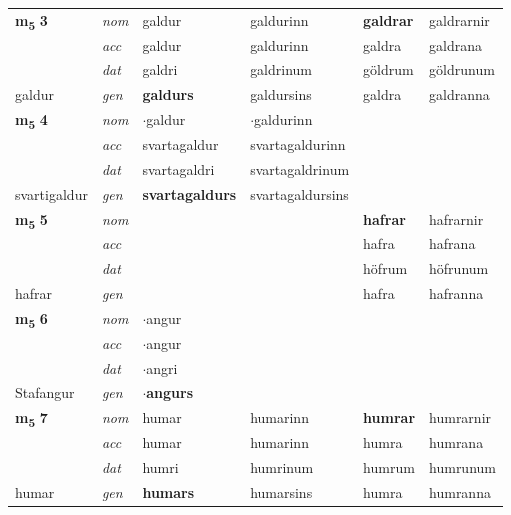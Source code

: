 \begin{longtable}[l]{llllll}
\multirow{3}{*}{{{\textbf{m{\textsubscript{5}}} \Large{\textbf{3}}}}}  & {\footnotesize{{\textit{nom}}}} & galdur & galdurinn    & \textbf{galdrar} & galdrarnir  \\*
 &  {\footnotesize{{\textit{acc}}}} & galdur  & galdurinn   & galdra  & galdrana \\*
 &  {\footnotesize{{\textit{dat}}}} & galdri & galdrinum   & göldrum & göldrunum \\*
 {\footnotesize{galdur}} &   {\footnotesize{{\textit{gen}}}} & \textbf{galdurs}  & galdursins  & galdra & galdranna \\
\cmidrule{1-6}


\multirow{3}{*}{{{\textbf{m{\textsubscript{5}}} \Large{\textbf{4}}}}}  & {\footnotesize{{\textit{nom}}}} & $\cdot$galdur & $\cdot$galdurinn    & \textbf{} &   \\*
 &  {\footnotesize{{\textit{acc}}}} & svartagaldur  & svartagaldurinn   &   &  \\*
 &  {\footnotesize{{\textit{dat}}}} & svartagaldri & svartagaldrinum   &  &  \\*
 {\footnotesize{svartigaldur}} &   {\footnotesize{{\textit{gen}}}} & \textbf{svartagaldurs}  & svartagaldursins  &  &  \\
\cmidrule{1-6}


\multirow{3}{*}{{{\textbf{m{\textsubscript{5}}} \Large{\textbf{5}}}}}  & {\footnotesize{{\textit{nom}}}} &  &     & \textbf{hafrar} & hafrarnir  \\*
 &  {\footnotesize{{\textit{acc}}}} &   &    & hafra  & hafrana \\*
 &  {\footnotesize{{\textit{dat}}}} &  &    & höfrum & höfrunum \\*
 {\footnotesize{hafrar}} &   {\footnotesize{{\textit{gen}}}} & \textbf{}  &   & hafra & hafranna \\
\cmidrule{1-6}


\multirow{3}{*}{{{\textbf{m{\textsubscript{5}}} \Large{\textbf{6}}}}}  & {\footnotesize{{\textit{nom}}}} & $\cdot$angur &     & \textbf{} &   \\*
 &  {\footnotesize{{\textit{acc}}}} & $\cdot$angur  &    &   &  \\*
 &  {\footnotesize{{\textit{dat}}}} & $\cdot$angri &    &  &  \\*
 {\footnotesize{Stafangur}} &   {\footnotesize{{\textit{gen}}}} & \textbf{$\cdot$angurs}  &   &  &  \\
\cmidrule{1-6}


\multirow{3}{*}{{{\textbf{m{\textsubscript{5}}} \Large{\textbf{7}}}}}  & {\footnotesize{{\textit{nom}}}} & humar & humarinn    & \textbf{humrar} & humrarnir  \\*
 &  {\footnotesize{{\textit{acc}}}} & humar  & humarinn   & humra  & humrana \\*
 &  {\footnotesize{{\textit{dat}}}} & humri & humrinum   & humrum & humrunum \\*
 {\footnotesize{humar}} &   {\footnotesize{{\textit{gen}}}} & \textbf{humars}  & humarsins  & humra & humranna \\
\cmidrule{1-6}



\end{longtable}

